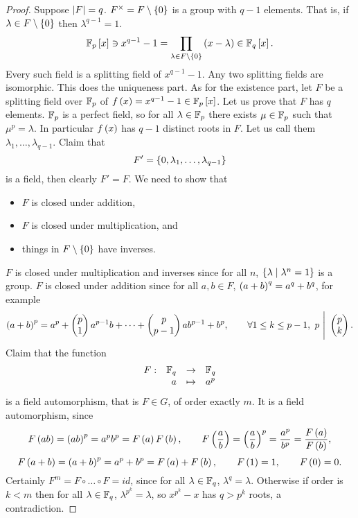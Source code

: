 \begin{proof}
Suppose $ \left\lvert F \right\rvert = q $. $ F^\times = F \setminus \left\{ 0 \right\} $ is a group with $ q - 1 $ elements. That is, if $ \lambda \in F \setminus \left\{ 0 \right\} $ then $ \lambda^{q - 1} = 1 $.
$$ \mathbb{F}_p\left[ x \right] \ni x^{q - 1} - 1 = \prod_{\lambda \in F \setminus \left\{ 0 \right\}} \left( x - \lambda \right) \in \mathbb{F}_q\left[ x \right]. $$
Every such field is a splitting field of $ x^{q - 1} - 1 $. Any two splitting fields are isomorphic. This does the uniqueness part. As for the existence part, let $ F $ be a splitting field over $ \mathbb{F}_p $ of $ f\left( x \right) = x^{q - 1} - 1 \in \mathbb{F}_p\left[ x \right] $. Let us prove that $ F $ has $ q $ elements. $ \mathbb{F}_p $ is a perfect field, so for all $ \lambda \in \mathbb{F}_p $ there exists $ \mu \in \mathbb{F}_p $ such that $ \mu^p = \lambda $. In particular $ f\left( x \right) $ has $ q - 1 $ distinct roots in $ F $. Let us call them $ \lambda_1, \dots, \lambda_{q - 1} $. Claim that
$$ F' = \left\{ 0, \lambda_1, \dots, \lambda_{q - 1} \right\} $$
is a field, then clearly $ F' = F $. We need to show that
\begin{itemize}
\item $ F $ is closed under addition,
\item $ F $ is closed under multiplication, and
\item things in $ F \setminus \left\{ 0 \right\} $ have inverses.
\end{itemize}
$ F $ is closed under multiplication and inverses since for all $ n $, $ \left\{ \lambda \mid \lambda^n = 1 \right\} $ is a group. $ F $ is closed under addition since for all $ a, b \in F $, $ \left( a + b \right)^q = a^q + b^q $, for example
$$ \left( a + b \right)^p = a^p + \begin{pmatrix} p \\ 1 \end{pmatrix}a^{p - 1}b + \dots + \begin{pmatrix} p \\ p - 1 \end{pmatrix}ab^{p - 1} + b^p, \qquad \forall 1 \le k \le p - 1, \ p \ \Bigg| \ \begin{pmatrix} p \\ k \end{pmatrix}. $$
Claim that the function
$$ \function[F]{\F_q}{\F_q}{a}{a^p} $$
is a field automorphism, that is $ F \in G $, of order exactly $ m $. It is a field automorphism, since
$$ F\left( ab \right) = \left( ab \right)^p = a^pb^p = F\left( a \right)F\left( b \right), \qquad F\left( \dfrac{a}{b} \right) = \left( \dfrac{a}{b} \right)^p = \dfrac{a^p}{b^p} = \dfrac{F\left( a \right)}{F\left( b \right)}, $$
$$ F\left( a + b \right) = \left( a + b \right)^p = a^p + b^p = F\left( a \right) + F\left( b \right), \qquad F\left( 1 \right) = 1, \qquad F\left( 0 \right) = 0. $$
Certainly $ F^m = F \circ \dots \circ F = id $, since for all $ \lambda \in \mathbb{F}_q $, $ \lambda^q = \lambda $. Otherwise if order is $ k < m $ then for all $ \lambda \in \mathbb{F}_q $, $ \lambda^{p^k} = \lambda $, so $ x^{p^k} - x $ has $ q > p^k $ roots, a contradiction.
\end{proof}

